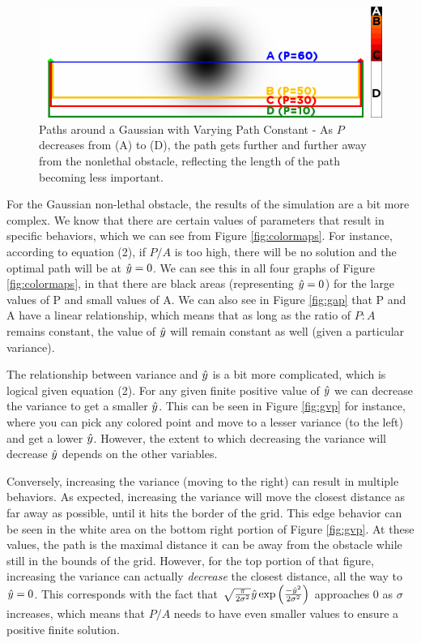 \begin{figure}
\includegraphics[width=\columnwidth]{graphix/SomePaths.png}
\caption{Paths around a Gaussian with Varying Path Constant - As $P$ decreases from (A) to (D), the path gets further and further away from the nonlethal obstacle, reflecting the length of the path becoming less important.}
\label{fig:somepaths}
\end{figure}

For the Gaussian non-lethal obstacle, the results of the simulation are a bit more complex. We know that there are certain values of parameters that result in specific behaviors, which we can see from Figure \ref{fig:colormaps}. For instance, according to equation (2), if $P/A$ is too high, there will be no solution and the optimal path will be at $\hat{y}=0$. We can see this in all four graphs of Figure \ref{fig:colormaps}, in that there are black areas (representing $\hat{y}=0$) for the large values of P and small values of A. We can also see in Figure \ref{fig:gap} that P and A have a linear relationship, which means that as long as the ratio of $P:A$ remains constant, the value of $\hat{y}$ will remain constant as well (given a particular variance). 

The relationship between variance and $\hat{y}$ is a bit more complicated, which is logical given equation (2). For any given finite positive value of $\hat{y}$ we can decrease the variance to get a smaller $\hat{y}$. This can be seen in Figure \ref{fig:gvp} for instance, where you can pick any colored point and move to a lesser variance (to the left) and get a lower $\hat{y}$. However, the extent to which decreasing the variance will decrease $\hat{y}$ depends on the other variables. 

Conversely, increasing the variance (moving to the right) can result in multiple behaviors. As expected, increasing the variance will move the closest distance as far away as possible, until it hits the border of the grid. This edge behavior can be seen in the white area on the bottom right portion of Figure \ref{fig:gvp}. At these values, the path is the maximal distance it can be away from the obstacle while still in the bounds of the grid. However, for the top portion of that figure, increasing the variance can actually \emph{decrease} the closest distance, all the way to $\hat{y}=0$. This corresponds with the fact that $ \sqrt{\frac{\pi}{2\sigma^2}} \hat{y} \exp\Big( \frac{-\hat{y}^2}{2\sigma^2} \Big) $ approaches 0 as $\sigma$ increases, which means that $P/A$ needs to have even smaller values to ensure a positive finite solution. 

